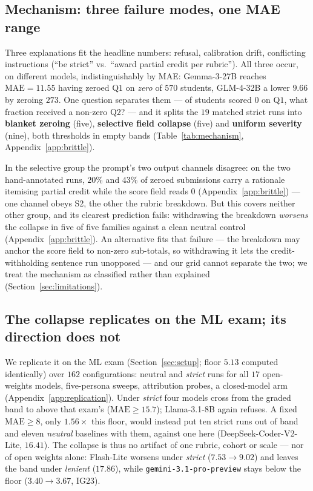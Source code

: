 \subsection{Mechanism: three failure modes, one MAE range}
\label{sec:brittle:mech}

Three explanations fit the headline numbers: refusal, calibration drift, conflicting instructions (``be strict'' vs.\ ``award partial credit per rubric''). All three occur, on different models, indistinguishably by MAE: Gemma-3-27B reaches $\text{MAE} = 11.55$ having zeroed Q$1$ on \emph{zero} of $570$ students, GLM-4-32B a lower $9.66$ by zeroing $273$. One question separates them --- of students scored $0$ on Q$1$, what fraction received a non-zero Q$2$? --- and it splits the $19$ matched strict runs into \textbf{blanket zeroing} (five), \textbf{selective field collapse} (five) and \textbf{uniform severity} (nine), both thresholds in empty bands (Table~\ref{tab:mechanism}, Appendix~\ref{app:brittle}).

In the selective group the prompt's two output channels disagree: on the two hand-annotated runs, $20\%$ and $43\%$ of zeroed submissions carry a rationale itemising partial credit while the score field reads $0$ (Appendix~\ref{app:brittle}) --- one channel obeys S2, the other the rubric breakdown. But this covers neither other group, and its clearest prediction fails: withdrawing the breakdown \emph{worsens} the collapse in five of five families against a clean neutral control (Appendix~\ref{app:brittle}). An alternative fits that failure --- the breakdown may anchor the score field to non-zero sub-totals, so withdrawing it lets the credit-withholding sentence run unopposed --- and our grid cannot separate the two; we treat the mechanism as classified rather than explained (Section~\ref{sec:limitations}).

\subsection{The collapse replicates on the ML exam; its direction does not}
\label{sec:brittle:replication}

We replicate it on the ML exam (Section~\ref{sec:setup}; floor $5.13$ computed identically) over $162$ configurations: neutral and \emph{strict} runs for all $17$ open-weights models, five-persona sweeps, attribution probes, a closed-model arm (Appendix~\ref{app:replication}). Under \emph{strict} four models cross from the graded band to above that exam's ($\text{MAE} \ge 15.7$); Llama-3.1-$8$B again refuses. A fixed $\text{MAE} \ge 8$, only $1.56\times$ this floor, would instead put ten strict runs out of band and eleven \emph{neutral} baselines with them, against one here (DeepSeek-Coder-V2-Lite, $16.41$). The collapse is thus no artifact of one rubric, cohort or scale --- nor of open weights alone: Flash-Lite worsens under \emph{strict} ($7.53 \to 9.02$) and leaves the band under \emph{lenient} ($17.86$), while \texttt{gemini-3.1-pro-preview} stays below the floor ($3.40 \to 3.67$, IG$23$).

